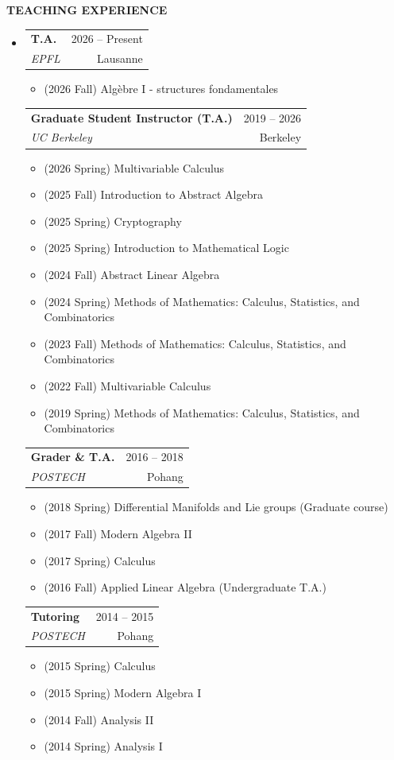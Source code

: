 \documentclass[letterpaper,11pt]{article}
\makeatletter
\newcommand{\resitem}[1]{\item #1}
\newcommand{\resheading}[1]{%
  \par\addvspace{10pt}%
  {\sffamily\bfseries\large\color{accent}\MakeUppercase{#1}}\par\nobreak
  \vspace{2pt}{\color{accent!35}\hrule height 0.7pt}\par\nobreak\vspace{5pt}}
\newcommand{\ressubheading}[4]{%
  \par\addvspace{3pt}%
  \begin{tabular*}{\linewidth}{@{}l@{\extracolsep{\fill}}r@{}}
    \textbf{#1} & {\sffamily\small\color{accent}#4} \\
    \textit{#3} & {\small\color{muted}#2} \\
  \end{tabular*}\par\nobreak\vspace{1pt}}
\makeatother
\begin{document}
\resheading{Teaching Experience}
\begin{itemize} 
\item[]
\ressubheading{T.A.}{Lausanne}{EPFL}{2026 -- Present}
	\begin{itemize}
		\resitem{(2026 Fall) Alg\`{e}bre I - structures fondamentales}
	\end{itemize}

\ressubheading{Graduate Student Instructor (T.A.)}{Berkeley}{UC Berkeley}{2019 -- 2026}
	\begin{itemize}
		\resitem{(2026 Spring) Multivariable Calculus}
		\resitem{(2025 Fall) Introduction to Abstract Algebra}
		\resitem{(2025 Spring) Cryptography}
		\resitem{(2025 Spring) Introduction to Mathematical Logic}
		\resitem{(2024 Fall) Abstract Linear Algebra}
		\resitem{(2024 Spring) Methods of Mathematics: Calculus, Statistics, and Combinatorics}
		\resitem{(2023 Fall) Methods of Mathematics: Calculus, Statistics, and Combinatorics}
		\resitem{(2022 Fall) Multivariable Calculus}
		\resitem{(2019 Spring) Methods of Mathematics: Calculus, Statistics, and Combinatorics}
	\end{itemize}


\ressubheading{Grader \& T.A.}{Pohang}{POSTECH}{2016 -- 2018}
	\begin{itemize}
		\resitem{(2018 Spring) Differential Manifolds and Lie groups (Graduate course)}
		\resitem{(2017 Fall) Modern Algebra II}
		\resitem{(2017 Spring) Calculus}
		\resitem{(2016 Fall) Applied Linear Algebra (Undergraduate T.A.)}
	\end{itemize}

\ressubheading{Tutoring}{Pohang}{POSTECH}{2014 -- 2015}
	\begin{itemize}
		\resitem{(2015 Spring) Calculus}
		\resitem{(2015 Spring) Modern Algebra I}
		\resitem{(2014 Fall) Analysis II}
		\resitem{(2014 Spring) Analysis I} 
	\end{itemize}
\end{itemize}
\end{document}
